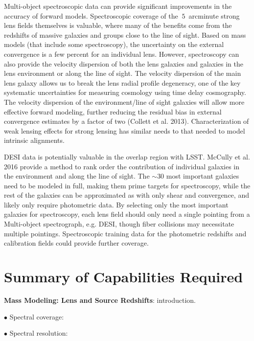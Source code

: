 Multi-object spectroscopic data can provide significant improvements in
the accuracy of forward models. Spectroscopic coverage of the
$~5$~arcminute strong lens fields themselves is valuable, where many of
the benefits come from the redshifts of massive galaxies and groups
close to the line of sight. Based on mass models (that include some
spectroscopy), the uncertainty on the external convergence is a few
percent for an individual lens. However, spectroscopy can also provide
the velocity dispersion of both the lens galaxies and galaxies in the
lens environment or along the line of sight. The velocity dispersion of
the main lens galaxy allows us to break the lens radial profile
degeneracy, one of the key systematic uncertainties for measuring
cosmology using time delay cosmography. The velocity dispersion of the
environment/line of sight galaxies will allow more effective forward
modeling, further reducing the residual bias in external convergence
estimates by a factor of two (Collett et al. 2013). Characterization of
weak lensing effects for strong lensing has similar needs to that needed
to model intrinsic alignments.

DESI data is potentially valuable in the overlap region with LSST.
McCully et al. 2016 provide a method to rank order the contribution of
individual galaxies in the environment and along the line of sight. The
$\sim 30$ most important galaxies need to be modeled in full, making
them prime targets for spectroscopy, while the rest of the galaxies can
be approximated as with only shear and convergence, and likely only
require photometric data. By selecting only the most important galaxies
for spectroscopy, each lens field should only need a single pointing
from a Multi-object spectrograph, e.g. DESI, though fiber collisions may
necessitate multiple pointings. Spectroscopic training data for the
photometric redshifts and calibration fields could provide further
coverage.


\section{Summary of Capabilities Required}
\label{sec:sl_summary}

{\bf Mass Modeling: Lens and Source Redshifts}: introduction.

$\bullet$ Spectral coverage:

$\bullet$ Spectral resolution:

